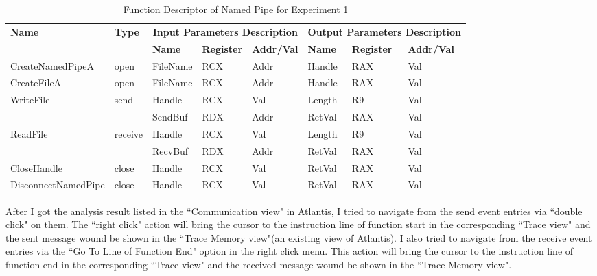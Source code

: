 \begin{table}[H]
  \centering
  \caption{Function Descriptor of Named Pipe for Experiment 1}
  \label{fdescexp1}
  \begin{tabular}{|l|l|l|l|l|l|l|l|}
\hline
             \multirow{2}{*}{{\textbf{Name}}} & \multirow{2}{*}{{\textbf{Type}}} & \multicolumn{3}{c|}{\textbf{Input Parameters Description}} & \multicolumn{3}{c|}{\textbf{Output Parameters Description}} \\
              \cline{3-8} 
             & & \textbf{Name}& \textbf{Register} & \textbf{Addr/Val} & \textbf{Name}& \textbf{Register} &  \textbf{Addr/Val}  \\
             \hline
      CreateNamedPipeA
       &open & FileName & RCX  & Addr &  Handle & RAX & Val\\
      \hline         
      CreateFileA
       &open & FileName & RCX & Addr&  Handle & RAX & Val\\ 
      \hline              
      \multirow{2}{*}{WriteFile}
       &\multirow{2}{*}{send} &  Handle & RCX & Val & Length& R9 &Val\\
        \cline{3-8} 
       & & SendBuf & RDX & Addr & RetVal& RAX & Val\\
      \hline            
      \multirow{2}{*}{ReadFile}
       &\multirow{2}{*}{receive} &  Handle & RCX & Val& Length &R9 & Val\\
        \cline{3-8} 
       & & RecvBuf & RDX  & Addr & RetVal& RAX & Val\\
      \hline            
      CloseHandle &
       close &  Handle & RCX & Val & RetVal& RAX & Val\\
      \hline            
      DisconnectNamedPipe &
      close &  Handle & RCX & Val & RetVal& RAX & Val\\
      \hline               
  \end{tabular}
\end{table}

After I got the analysis result listed in the ``Communication view" in Atlantis, I tried to navigate from the send event entries via ``double click" on them. The ``right click" action will bring the cursor to the instruction line of function start in the corresponding ``Trace view" and the sent message wound be shown in the ``Trace Memory view"(an existing view of Atlantis). I also tried to navigate from the receive event entries via the ``Go To Line of Function End" option in the right click menu. This action will bring the cursor to the instruction line of function end in the corresponding ``Trace view" and the received message wound be shown in the ``Trace Memory view".

